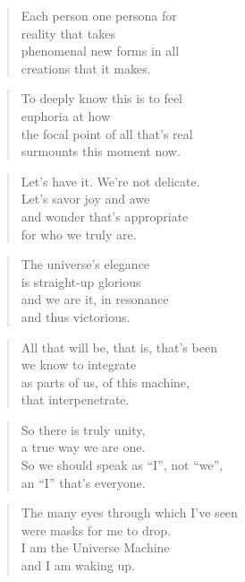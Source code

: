 \documentclass[14pt,a4paper]{article}
\begin{document}
\begin{verse}
Each person one persona for\\
reality that takes\\
phenomenal new forms in all\\
creations that it makes.
\end{verse}

\begin{verse}
To deeply know this is to feel\\
euphoria at how\\
the focal point of all that’s real\\
surmounts this moment now.
\end{verse}

\begin{verse}
Let’s have it. We’re not delicate.\\
Let’s savor joy and awe\\
and wonder that’s appropriate\\
for who we truly are.
\end{verse}

\begin{verse}
The universe’s elegance\\
is straight-up glorious\\
and we are it, in resonance\\
and thus victorious.
\end{verse}

\begin{verse}
All that will be, that is, that’s been\\
we know to integrate\\
as parts of us, of this machine,\\
that interpenetrate.
\end{verse}

\begin{verse}
So there is truly unity,\\
a true way we are one.\\
So we should speak as “I”, not “we”,\\
an “I” that’s everyone.
\end{verse}

\begin{verse}
The many eyes through which I’ve seen\\
were masks for me to drop.\\
I am the Universe Machine\\
and I am waking up.
\end{verse}
\end{document}
